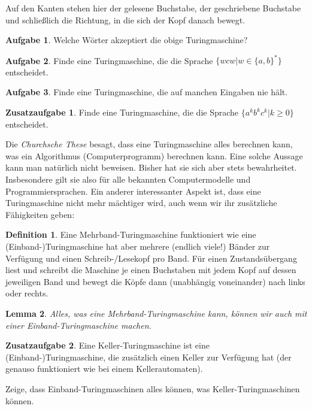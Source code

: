 \documentclass[a4paper,ngerman,12pt]{scrartcl}
\theoremstyle{definition}
\newtheorem{defn}{Definition}[]
\newtheorem{aufg}{Aufgabe}
\newtheorem{zaufg}{Zusatzaufgabe}
\theoremstyle{plain}
\newtheorem{lemma}[defn]{Lemma}
\theoremstyle{remark}
\begin{document}
Auf den Kanten stehen hier der gelesene Buchstabe, der geschriebene Buchstabe und schließlich die Richtung, in die sich der Kopf danach bewegt.

\begin{aufg}
	Welche Wörter akzeptiert die obige Turingmaschine?
\end{aufg}

\begin{aufg}
	Finde eine Turingmaschine, die die Sprache $\{wcw | w \in \{a,b\}^*\}$ entscheidet.
\end{aufg}

\begin{aufg}
	Finde eine Turingmaschine, die auf manchen Eingaben nie hält.
\end{aufg}

\begin{zaufg}
	Finde eine Turingmaschine, die die Sprache $\{a^kb^kc^k | k \geq 0\}$ entscheidet.
\end{zaufg}

Die \emph{Churchsche These} besagt, dass eine Turingmaschine alles berechnen kann, was ein Algorithmus (Computerprogramm) berechnen kann. Eine solche Aussage kann man natürlich nicht beweisen. Bisher hat sie sich aber stets bewahrheitet. Insbesondere gilt sie also für alle bekannten Computermodelle und Programmiersprachen. Ein anderer interessanter Aspekt ist, dass eine Turingmaschine nicht mehr mächtiger wird, auch wenn wir ihr zusätzliche Fähigkeiten geben:

\begin{defn}
	Eine Mehrband-Turingmaschine funktioniert wie eine (Einband-)Turingmaschine hat aber mehrere (endlich viele!) Bänder zur Verfügung und einen Schreib-/Lesekopf pro Band. Für einen Zustandsübergang liest und schreibt die Maschine je einen Buchstaben mit jedem Kopf auf dessen jeweiligen Band und bewegt die Köpfe dann (unabhängig voneinander) nach links oder rechts.
\end{defn}

\begin{lemma}
	Alles, was eine Mehrband-Turingmaschine kann, können wir auch mit einer Einband-Turingmaschine machen.
\end{lemma}

\begin{zaufg}
	Eine Keller-Turingmaschine ist eine (Einband-)Turingmaschine, die zusätzlich einen Keller zur Verfügung hat (der genauso funktioniert wie bei einem Kellerautomaten).
	
	Zeige, dass Einband-Turingmaschinen alles können, was Keller-Turingmaschinen können.
\end{zaufg}
\end{document}
